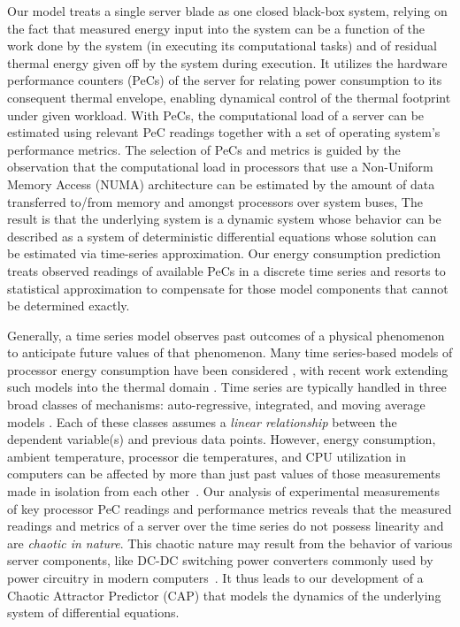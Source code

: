 \documentclass[prodmode,acmtaco,pdftex]{acmsmall}
\begin{document}
Our model treats a single server blade as one closed black-box system,
relying on the fact that measured energy input into the system can be a
function of the work done by the system (in executing its computational
tasks) and of residual thermal energy given off by the system during
execution.  It utilizes the hardware performance counters (PeCs) of the
server for relating power consumption to its consequent thermal
envelope, enabling dynamical control of the thermal footprint under
given workload.  With PeCs, the computational load of a server can be
estimated using relevant PeC readings together with a set of operating
system's performance metrics. The selection of PeCs and metrics is
guided by the observation that the computational load in processors that
use a Non-Uniform Memory Access (NUMA) architecture can be estimated by
the amount of data transferred to/from memory and amongst processors
over system buses, The result is that the underlying system is a dynamic
system whose behavior can be described as a system of deterministic
differential equations whose solution can be estimated via time-series
approximation. Our energy consumption prediction treats observed
readings of available PeCs in a discrete time series and resorts to
statistical approximation to compensate for those model components that
cannot be determined exactly.

Generally, a time series model observes past outcomes of a
physical phenomenon to anticipate future values of that
phenomenon.  Many time series-based models of processor energy
consumption have been considered
\cite{Rivoire2008a,Bhattacharjee2009,Powell2009,Reich2010,Bircher2011},
with recent work extending such models into the thermal domain
\cite{Coskun2008}.  Time series are typically handled in three broad
classes of mechanisms: auto-regressive, integrated, and moving average
models \cite{Box1994}.  Each of these classes assumes a \textit{linear
relationship} between the dependent variable(s) and previous data
points. However, energy consumption, ambient temperature, processor die
temperatures, and CPU utilization in computers can be affected by more
than just past values of those measurements made in isolation from each
other~\cite{Bertran2010,McCullough2011}.  Our analysis of experimental
measurements of key processor PeC readings and performance metrics
reveals that the measured readings and metrics of a server over the time
series do not possess linearity and are \textit{chaotic in nature}.
This chaotic nature may result from the behavior of various server components,
like DC-DC switching power converters commonly used by power circuitry in modern
computers~\cite{Hamill1997,Tse2002}.
It thus leads to our development of a Chaotic Attractor Predictor (CAP)
that models the dynamics of the underlying system of differential equations.
\end{document}
